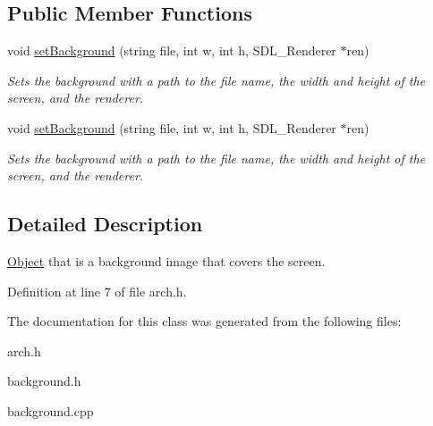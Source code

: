 \subsection*{Public Member Functions}
\begin{DoxyCompactItemize}
\item 
void \hyperlink{classBackground_ae0b55ad792ad37c5d7c200c47ff09859}{set\+Background} (string file, int w, int h, S\+D\+L\+\_\+\+Renderer $\ast$ren)\hypertarget{classBackground_ae0b55ad792ad37c5d7c200c47ff09859}{}\label{classBackground_ae0b55ad792ad37c5d7c200c47ff09859}

\begin{DoxyCompactList}\small\item\em Sets the background with a path to the file name, the width and height of the screen, and the renderer. \end{DoxyCompactList}\item 
void \hyperlink{classBackground_ae0b55ad792ad37c5d7c200c47ff09859}{set\+Background} (string file, int w, int h, S\+D\+L\+\_\+\+Renderer $\ast$ren)\hypertarget{classBackground_ae0b55ad792ad37c5d7c200c47ff09859}{}\label{classBackground_ae0b55ad792ad37c5d7c200c47ff09859}

\begin{DoxyCompactList}\small\item\em Sets the background with a path to the file name, the width and height of the screen, and the renderer. \end{DoxyCompactList}\end{DoxyCompactItemize}


\subsection{Detailed Description}
\hyperlink{classObject}{Object} that is a background image that covers the screen. 

Definition at line 7 of file arch.\+h.



The documentation for this class was generated from the following files\+:\begin{DoxyCompactItemize}
\item 
arch.\+h\item 
background.\+h\item 
background.\+cpp\end{DoxyCompactItemize}
